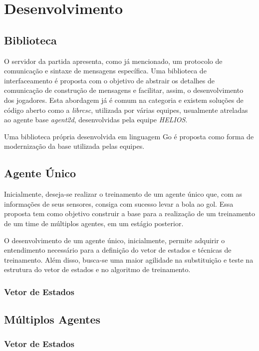 \chapter{Desenvolvimento \label{chap:Desenvolvimento}}



\section{Biblioteca}
\par O servidor da partida apresenta, como já mencionado, um protocolo de comunicação e sintaxe de mensagens específica. Uma biblioteca de interfaceamento é proposta com o objetivo de abstrair os detalhes de comunicação de construção de mensagens e facilitar, assim, o desenvolvimento dos jogadores. Esta abordagem já é comum na categoria e existem soluções de código aberto como a \textit{librcsc}, utilizada por várias equipes, usualmente atreladas ao agente base \textit{agent2d}, desenvolvidas pela equipe \textit{HELIOS}.
\par Uma biblioteca própria desenvolvida em linguagem Go é proposta como forma de modernização da base utilizada pelas equipes.

\section{Agente Único}
\par Inicialmente, deseja-se realizar o treinamento de um agente único que, com as informações de seus sensores, consiga com sucesso levar a bola ao gol. Essa proposta tem como objetivo construir a base para a realização de um treinamento de um time de múltiplos agentes, em um estágio posterior.
\par O desenvolvimento de um agente único, inicialmente, permite adquirir o entendimento necessário para a definição do vetor de estados e técnicas de treinamento. Além disso, busca-se uma maior agilidade na substituição e teste na estrutura do vetor de estados e no algoritmo de treinamento.

\subsection{Vetor de Estados}

\section{Múltiplos Agentes}

\subsection{Vetor de Estados}


